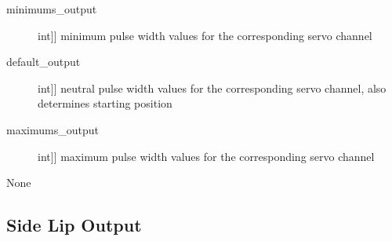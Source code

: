 \documentclass[letterpaper,10pt,english]{sphinxmanual}
\begin{document}
\begin{fulllineitems}
\begin{fulllineitems}
\sphinxAtStartPar
{}
\begin{description}
\item[{minimums\_output}] \leavevmode{[}{[}int{]}{]}
\sphinxAtStartPar
minimum pulse width values for the corresponding servo channel

\item[{default\_output}] \leavevmode{[}{[}int{]}{]}
\sphinxAtStartPar
neutral pulse width values for the corresponding servo channel, also determines starting position

\item[{maximums\_output}] \leavevmode{[}{[}int{]}{]}
\sphinxAtStartPar
maximum pulse width values for the corresponding servo channel

\end{description}

\sphinxAtStartPar
{}

\sphinxAtStartPar
None

\end{fulllineitems}


\end{fulllineitems}



\subsection{Side Lip Output}
\label{\detokenize{specific:module-SideLipOutput}}\label{\detokenize{specific:side-lip-output}}
\end{document}
